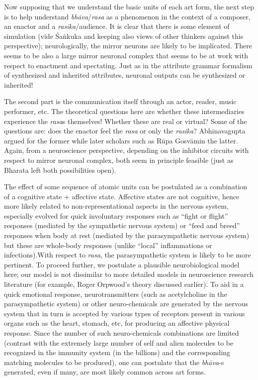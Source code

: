 Now supposing that we understand the basic units of each art form, the next step is to help understand \textsl{bhāva}/\textsl{rasa} as a phenomenon in the context of a composer, an enactor and a \textsl{rasika}/audience. It is clear that there is some element of simulation (vide Śaṅkuka and keeping also views of other thinkers against this perspective); neurologically, the mirror neurons are likely to be implicated. There seems to be also a large mirror neuronal complex that seems to be at work with respect to enactment and spectating. Just as in the attribute grammar formalism of synthesized and inherited attributes, neuronal outputs can be synthesized or inherited!

The second part is the communication itself through an actor, reader, music performer, etc. The theoretical questions here are whether these intermediaries experience the \textsl{rasa}s themselves! Whether these are real or virtual? Some of the questions are: does the enactor feel the \textsl{rasa} or only the \textsl{rasika}? Abhinavagupta argued for the former while later scholars such as Rūpa Gosvāmin the latter. Again, from a neuroscience perspective, depending on the inhibitor circuits with respect to mirror neuronal complex, both seem in principle feasible (just as Bharata left both possibilities open).

The effect of some sequence of atomic units can be postulated as a combination of a cognitive state + affective state. Affective states are not cognitive, hence more likely related to non-representational aspects in the nervous system, especially evolved for quick involuntary responses such as “fight or flight” responses (mediated by the sympathetic nervous system) or “feed and breed” responses when body at rest (mediated by the parasympathetic nervous system) but these are whole-body responses (unlike “local” inflammations or infections).\break With respect to \textsl{rasa}, the parasympathetic system is likely to be more pertinent. To proceed further, we postulate a plausible neurobiological model here; our model is not dissimilar to more detailed models in neuroscience research literature (for example, Roger Orpwood’s theory discussed earlier). To aid in a quick emotional response, neurotransmitters (such as acetylcholine in the parasympathetic system) or other neuro-chemicals are generated by the nervous system that in turn is accepted by various types of receptors present in various organs such as the heart, stomach, etc, for producing an affective physical response. Since the number of such neuro-chemicals combinations are limited (contrast with the extremely large number of self and alien molecules to be recognized in the immunity system (in the billions) and the corresponding matching molecules to be produced), one can postulate that the \textsl{bhāva}-s generated, even if many, are most likely common across art forms. 

